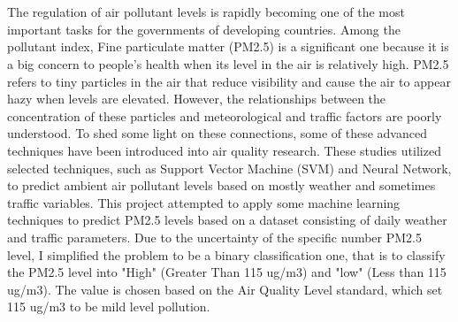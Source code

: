 




\chapter*{}
\hspace{0.1cm}The regulation of air pollutant levels is rapidly becoming one of the most important tasks for the governments of developing countries. Among the pollutant index, Fine particulate matter (PM2.5) is a significant one because it is a big concern to people's health when its level in the air is relatively high. PM2.5 refers to tiny particles in the air that reduce visibility and cause the air to appear hazy when levels are elevated. However, the relationships between the concentration of these particles and meteorological and traffic factors are poorly understood. To shed some light on these connections, some of these advanced techniques have been introduced into air quality research. These studies utilized selected techniques, such as Support Vector Machine (SVM) and Neural Network, to predict ambient air pollutant levels based on mostly weather and sometimes traffic variables. This project attempted to apply some machine learning techniques to predict PM2.5 levels based on a dataset consisting of daily weather and traffic parameters. Due to the uncertainty of the specific number PM2.5 level, I simplified the problem to be a binary classification one, that is to classify the PM2.5 level into "High" (Greater Than 115 ug/m3) and "low" (Less than 115 ug/m3). The value is chosen based on the Air Quality Level standard, which set 115 ug/m3 to be mild level pollution.\\\\

%       
%
\tableofcontents
{}
\listoffigures
\mainmatter



